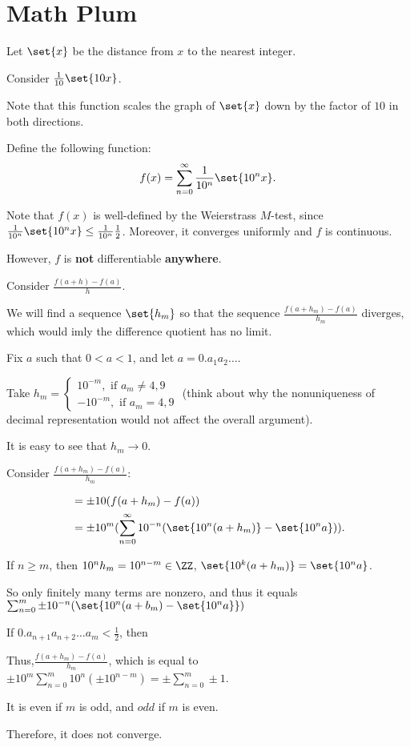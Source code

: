 \documentclass[11pt]{scrartcl}
\begin{document}
\section{Math Plum}

Let $\set{x}$ be the distance from $x$ to the nearest integer.

Consider $\frac{1}{10} \set{10 x}$.

Note that this function scales the graph of $\set{x}$ down by the
factor of $10$ in both directions.

Define the following function:
\begin{equation}
  f(x) = \sum_{n=0}^{\infty}\frac{1}{10^n} \set{10^nx}.
\end{equation}

Note that $f(x)$ is well-defined by the Weierstrass $M$-test, since
$\frac{1}{10^n} \set{10^nx} \leq \frac{1}{10^n}\frac{1}{2}
$. Moreover, it converges uniformly and $f$ is continuous.

However, $f$ is \textbf{not} differentiable \textbf{anywhere}.

Consider $\frac{f(a+h)-f(a)}{h}$.

We will find a sequence $\set{h_m}$ so that the sequence
$\frac{f(a+h_m)-f(a)}{h_{m}}$ diverges, which would imly the
difference quotient has no limit.

Fix $a$ such that $0 < a < 1$, and let $a= 0.a_1a_2\dots$.

Take $h_m = 
\begin{cases}
  10^{-m}, \text{ if $a_m \neq 4, 9$ }\\
  -10^{-m}, \text{ if $a_m = 4, 9$}
\end{cases}
$ (think about why the nonuniqueness of decimal representation would not affect the overall argument).


It is easy to see that $h_m\to 0$.

Consider $\frac{f(a+h_m) - f(a)}{h_m}$:

\begin{align}
&= \pm 10 (f(a+h_m) - f(a))\\ 
&= \pm 10^m (\sum_{n=0}^{\infty}10^{-n}(\set{10^n(a+h_m)} - \set{10^na})).
\end{align}

If $n \geq m$, then $10^nh_m=10^{n-m} \in \ZZ$, $\set{10^k(a+h_m)} = \set{10^na}$.

So only finitely many terms are nonzero, and thus it equals $\sum_{n=0}^{m}\pm 10^{-n}(\set{10^n(a+b_{m}) - \set{10^na}})$

If $0.a_{n+1}a_{n+2}\dots a_m  < \frac{1}{2}$, then 

Thus,$\frac{f(a+h_m) - f(a)}{h_m}$, which is equal to
$\pm 10^m\sum_{n=0}^m10^{n}(\pm 10^{n-m}) = \pm \sum_{n=0}^m\pm 1$.

It is even if $m$ is odd, and $odd$ if $m$ is even. 

Therefore, it does not converge.
\end{document}
